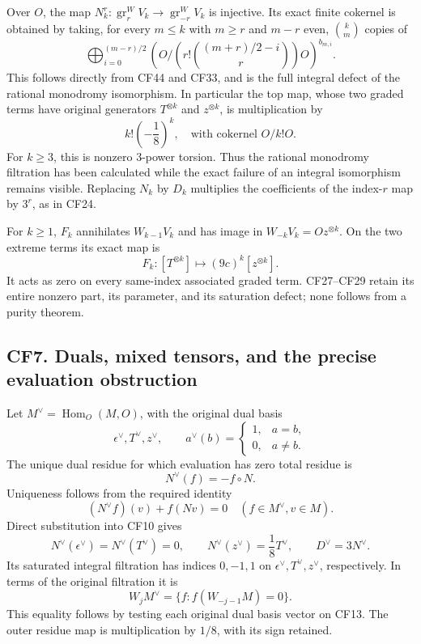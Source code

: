 Over \(O\), the map \(N_k^r:\operatorname{gr}_r^WV_k\to\operatorname{gr}_{-r}^WV_k\) is injective. Its exact finite cokernel is obtained by taking, for every \(m\leq k\) with \(m\geq r\) and \(m-r\) even, \(\binom km\) copies of
\[
 \bigoplus_{i=0}^{(m-r)/2}
 \left(O\Big/\left(r!\binom{(m+r)/2-i}{r}\right)O\right)^{b_{m,i}}.
 \tag{CF49}
\]
This follows directly from CF44 and CF33, and is the full integral defect of the rational monodromy isomorphism. In particular the top map, whose two graded terms have original generators \(T^{\otimes k}\) and \(z^{\otimes k}\), is multiplication by
\[
 k!\left(-\frac18\right)^k,
 \quad\text{with cokernel }O/k!O.
 \tag{CF50}
\]
For \(k\geq3\), this is nonzero \(3\)-power torsion. Thus the rational monodromy filtration has been calculated while the exact failure of an integral isomorphism remains visible. Replacing \(N_k\) by \(D_k\) multiplies the coefficients of the index-\(r\) map by \(3^r\), as in CF24.

For \(k\geq1\), \(F_k\) annihilates \(W_{k-1}V_k\) and has image in \(W_{-k}V_k=Oz^{\otimes k}\). On the two extreme terms its exact map is
\[
 F_k:[T^{\otimes k}]\longmapsto(9c)^k[z^{\otimes k}].
 \tag{CF51}
\]
It acts as zero on every same-index associated graded term. CF27--CF29 retain its entire nonzero part, its parameter, and its saturation defect; none follows from a purity theorem.

\subsection{CF7. Duals, mixed tensors, and the precise evaluation obstruction}\label{cf7.-duals-mixed-tensors-and-the-precise-evaluation-obstruction}

Let \(M^\vee=\operatorname{Hom}_O(M,O)\), with the original dual basis
\[
 \epsilon^\vee,T^\vee,z^\vee,
 \qquad a^\vee(b)=\begin{cases}1,&a=b,\\0,&a\neq b.\end{cases}
\]
The unique dual residue for which evaluation has zero total residue is
\[
 N^\vee(f)=-f\circ N.
 \tag{CF52}
\]
Uniqueness follows from the required identity
\[
 (N^\vee f)(v)+f(Nv)=0
 \quad(f\in M^\vee,v\in M).
 \tag{CF53}
\]
Direct substitution into CF10 gives
\[
 N^\vee(\epsilon^\vee)=N^\vee(T^\vee)=0,
 \qquad N^\vee(z^\vee)=\frac18T^\vee,
 \qquad D^\vee=3N^\vee.
 \tag{CF54}
\]
Its saturated integral filtration has indices \(0,-1,1\) on \(\epsilon^\vee,T^\vee,z^\vee\), respectively. In terms of the original filtration it is
\[
 W_jM^\vee=\{f:f(W_{-j-1}M)=0\}.
 \tag{CF55}
\]
This equality follows by testing each original dual basis vector on CF13. The outer residue map is multiplication by \(1/8\), with its sign retained.

